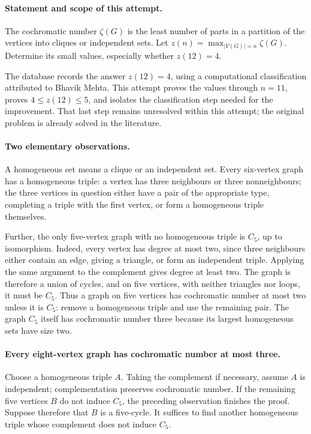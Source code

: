 \paragraph{Statement and scope of this attempt.}
The cochromatic number \(\zeta(G)\) is the least number of parts in a partition of the vertices into cliques or independent sets. Let \(z(n)=\max_{|V(G)|=n}\zeta(G)\). Determine its small values, especially whether \(z(12)=4\).

The database records the answer \(z(12)=4\), using a computational classification attributed to Bhavik Mehta. This attempt proves the values through \(n=11\), proves \(4\leq z(12)\leq5\), and isolates the classification step needed for the improvement. That last step remains unresolved within this attempt; the original problem is already solved in the literature.

\paragraph{Two elementary observations.}
A homogeneous set means a clique or an independent set. Every six-vertex graph has a homogeneous triple: a vertex has three neighbours or three nonneighbours; the three vertices in question either have a pair of the appropriate type, completing a triple with the first vertex, or form a homogeneous triple themselves.

Further, the only five-vertex graph with no homogeneous triple is \(C_5\), up to isomorphism. Indeed, every vertex has degree at most two, since three neighbours either contain an edge, giving a triangle, or form an independent triple. Applying the same argument to the complement gives degree at least two. The graph is therefore a union of cycles, and on five vertices, with neither triangles nor loops, it must be \(C_5\). Thus a graph on five vertices has cochromatic number at most two unless it is \(C_5\): remove a homogeneous triple and use the remaining pair. The graph \(C_5\) itself has cochromatic number three because its largest homogeneous sets have size two.

\paragraph{Every eight-vertex graph has cochromatic number at most three.}
Choose a homogeneous triple \(A\). Taking the complement if necessary, assume \(A\) is independent; complementation preserves cochromatic number. If the remaining five vertices \(B\) do not induce \(C_5\), the preceding observation finishes the proof. Suppose therefore that \(B\) is a five-cycle. It suffices to find another homogeneous triple whose complement does not induce \(C_5\).

